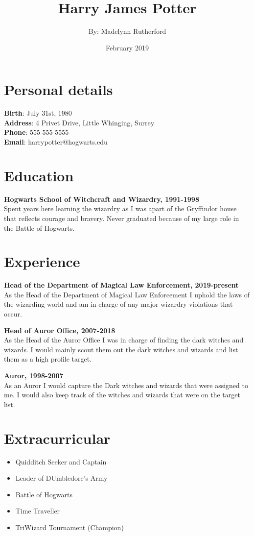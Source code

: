 \documentclass[12pt, letterpaper, twoside] {article}
\title{Harry James Potter}
\author{By: Madelynn Rutherford}
\date{February 2019}
\begin{document}
\maketitle

\section{Personal details}

\textbf{Birth}: July 31st, 1980\\
\textbf{Address}: 4 Privet Drive, Little Whinging, Surrey\\
\textbf{Phone}: 555-555-5555\\
\textbf{Email}: harrypotter@hogwarts.edu\\

\section{Education}

\textbf{Hogwarts School of Witchcraft and Wizardry, 1991-1998}\\
Spent years here learning the wizardry as I was apart of the Gryffindor house that reflects courage and bravery. Never graduated because of my large role in the Battle of Hogwarts. 

\section{Experience}

\textbf{Head of the Department of Magical Law Enforcement, 2019-present}\\
As the Head of the Department of Magical Law Enforcement I uphold the laws of the wizarding world and am in charge of any major wizardry violations that occur.

\textbf{Head of Auror Office, 2007-2018}\\
As the Head of the Auror Office I was in charge of finding the dark witches and wizards. I would mainly scout them out the dark witches and wizards and list them as a high profile target.

\textbf{Auror, 1998-2007}\\
As an Auror I would capture the Dark witches and wizards that were assigned to me. I would also keep track of the witches and wizards that were on the target list.\\

\section{Extracurricular}
 \begin{itemize}
     \item Quidditch Seeker and Captain 
     \item Leader of DUmbledore's Army 
     \item Battle of Hogwarts
     \item Time Traveller
     \item TriWizard Tournament (Champion)
 \end{itemize}
\end{document}
